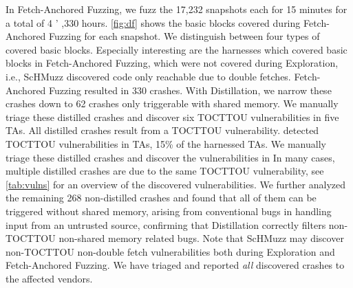 \documentclass[conference]{IEEEtran} %
\newcommand{\sysname}{ScHMuzz\xspace}
\newcommand{\stageone}{Exploration\xspace}
\newcommand{\stagetwo}{Fetch-Anchored Fuzzing\xspace} %
\newcommand{\stagethree}{Distillation\xspace}
\newcommand{\numdfsmerge}{17,232\xspace}
\newcommand{\numcrashes}{330\xspace}
\newcommand{\numcrashesdistill}{62\xspace}
\newcommand{\numvulns}{six\xspace}
\newcommand{\numvulnTAs}{five\xspace}
\providecommand{\DIFaddtex}[1]{{\protect\color{blue} \sf #1}} %
\providecommand{\DIFdeltex}[1]{{\protect\color{red} \scriptsize #1}} %
\providecommand{\DIFaddbegin}{} %
\providecommand{\DIFaddend}{} %
\providecommand{\DIFdelbegin}{} %
\providecommand{\DIFdelend}{} %
\providecommand{\DIFadd}[1]{\texorpdfstring{\DIFaddtex{#1}}{#1}} %
\providecommand{\DIFdel}[1]{\texorpdfstring{\DIFdeltex{#1}}{}} %
\begin{document}
In \stagetwo, we fuzz the \numdfsmerge snapshots each for 15 minutes for a total of 4\DIFdelbegin \DIFdel{'}\DIFdelend \DIFaddbegin \DIFadd{,}\DIFaddend 330 hours. 
\autoref{fig:df} shows the basic blocks covered during \stagetwo for each snapshot. 
We distinguish between four types of covered basic blocks. Especially interesting are the harnesses which covered basic blocks in \stagetwo, which 
were not covered during \stageone, i.e., \sysname discovered code only reachable due to double 
fetches. \stagetwo resulted in \numcrashes crashes. With \stagethree, we narrow these crashes 
down to \numcrashesdistill crashes only triggerable with shared memory. 
\DIFaddbegin \DIFadd{We manually triage these distilled 
crashes and discover }\numvulns{} \DIFadd{TOCTTOU vulnerabilities in }\numvulnTAs \DIFadd{TAs. 
}\DIFaddend All distilled crashes result from a TOCTTOU vulnerability. \DIFdelbegin %
\DIFdel{detected TOCTTOU vulnerabilities 
in }%
\DIFdel{TAs, 15\% of the harnessed TAs.
We manually triage these distilled 
crashes and discover the }%
\DIFdel{vulnerabilities in }\DIFdelend \DIFaddbegin \DIFadd{In many cases, multiple distilled 
crashes are due to the same TOCTTOU vulnerability, see }\DIFaddend \autoref{tab:vulns} 
\DIFaddbegin \DIFadd{for an overview of the discovered vulnerabilities}\DIFaddend .
We further analyzed the remaining 268 non-distilled crashes and found that all of them can 
be triggered without shared memory, arising from conventional bugs in handling input from 
an untrusted source, confirming that \stagethree correctly filters \DIFdelbegin \DIFdel{non-TOCTTOU }\DIFdelend \DIFaddbegin \DIFadd{non-shared memory related }\DIFaddend bugs. 
Note that \sysname may discover \DIFdelbegin \DIFdel{non-TOCTTOU }\DIFdelend \DIFaddbegin \DIFadd{non-double fetch }\DIFaddend vulnerabilities both during 
\stageone and \stagetwo. We have \DIFdelbegin \DIFdel{triaged and }\DIFdelend reported \emph{all} discovered crashes to 
the affected vendors.
\end{document}
